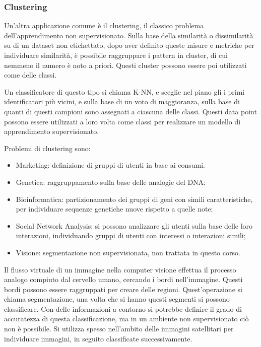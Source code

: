 \documentclass{article}
\numberwithin{equation}{subsection}
\begin{document}
\subsubsection{Clustering}

Un'altra applicazione comune è il clustering, il classico problema dell'apprendimento non 
supervisionato. Sulla base della similarità o dissimilarità su di un dataset non etichettato, dopo aver definito queste misure e metriche per individuare similarità, è 
possibile raggruppare i pattern in cluster, di cui nemmeno il numero è noto a priori. Questi 
cluster possono essere poi utilizzati come delle classi. 

Un classificatore di questo tipo si chiama K-NN, e sceglie nel piano gli i primi identificatori più vicini, e sulla base di un voto di maggioranza, sulla base di quanti di questi campioni sono assegnati a ciascuna delle classi. 
Questi data point possono essere utilizzati a loro volta come classi per realizzare un 
modello di apprendimento supervisionato. 

Problemi di clustering sono:
\begin{itemize}
    \item Marketing: definizione di gruppi di utenti in base ai consumi. 
    \item Genetica: raggruppamento sulla base delle analogie del DNA;
    \item Bioinformatica: partizionamento dei gruppi di geni con simili caratteristiche, per individuare sequenze genetiche nuove rispetto a quelle note;
    \item Social Network Analysis: si possono analizzare gli utenti sulla base delle loro interazioni, individuando gruppi di utenti con interessi o interazioni simili; 
    \item Visione: segmentazione non supervisionata, non trattata in questo corso. 
\end{itemize}

Il flusso virtuale di un immagine nella computer visione effettua il processo analogo 
compiuto dal cervello umano, cercando i bordi nell'immagine. Questi bordi possono essere 
raggruppati per creare delle regioni. Quest'operazione si chiama segmentazione, una volta 
che si hanno questi segmenti si possono classificare. Con delle informazioni a contorno si potrebbe definire il grado di accuratezza di questa classificazione, ma in un ambiente non supervisionato ciò non è possibile. Si utilizza spesso nell'ambito delle immagini satellitari per individuare immagini, in seguito classificate successivamente. 
\end{document}
